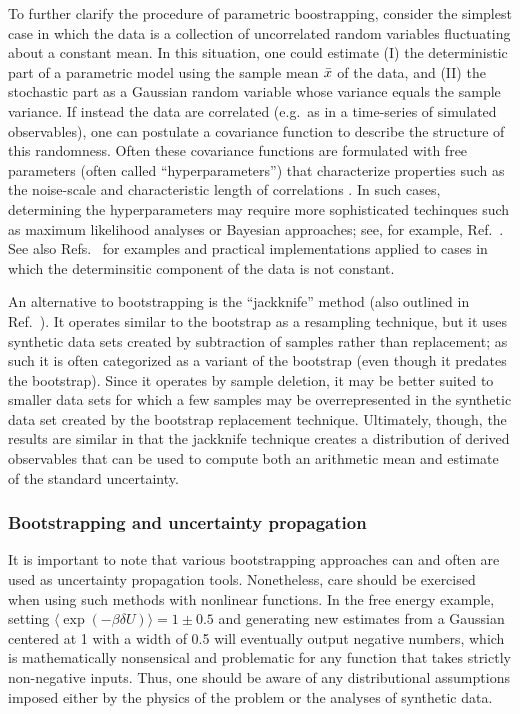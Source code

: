 To further clarify the procedure of parametric boostrapping, consider the simplest case in which the data is a collection of uncorrelated random variables fluctuating about a constant mean.  In this situation, one could estimate (I) the deterministic part of a parametric model using the sample mean $\bar{x}$ of the data, and (II) the stochastic part as a Gaussian random variable whose variance equals the sample variance.  If instead the data are correlated (e.g.\ as in a time-series of simulated observables),  one can postulate a covariance function to describe the structure of this randomness.  Often these covariance functions are formulated with free parameters (often called ``hyperparameters'') that characterize properties such as the noise-scale and characteristic length of correlations \cite{Rasmussen}.  In such cases, determining the hyperparameters may require more sophisticated techinques such as maximum likelihood analyses or Bayesian approaches; see, for example, Ref.~\cite{Rasmussen}.  See also Refs.~\cite{patrone1,patrone2,patrone3,Boettinger2017} for examples and practical implementations applied to cases in which the determinsitic component of the data is not constant.

An alternative to bootstrapping is the ``jackknife'' method\cite{Quenouille_Approximate_1949,Quenouille_Notes_1956,Tukey_Bias_1958} (also outlined in Ref.~\cite{Tibshirani1998}). It operates similar to the bootstrap as a resampling technique, but it uses synthetic data sets created by subtraction of samples rather than replacement; as such it is often categorized as a variant of the bootstrap (even though it predates the bootstrap). Since it operates by sample deletion, it may be better suited to smaller data sets for which a few samples may be overrepresented in the synthetic data set created by the bootstrap replacement technique. Ultimately, though, the results are similar in that the jackknife technique creates a distribution of derived observables that can be used to compute both an arithmetic mean and estimate of the standard uncertainty.

\subsubsection{Bootstrapping and uncertainty propagation}

It is important to note that various bootstrapping approaches can and often are used as uncertainty propagation tools.  Nonetheless, care should be exercised when using such methods with nonlinear functions.  In the free energy example, setting $\langle \exp(-\beta \delta U)\rangle = 1 \pm 0.5$ and generating new estimates from a Gaussian centered at 1 with a width of 0.5 will eventually output negative numbers, which is mathematically nonsensical and problematic for any function that takes strictly non-negative inputs.  Thus, one should be aware of any distributional assumptions imposed either by the physics of the problem or the analyses of synthetic data.


